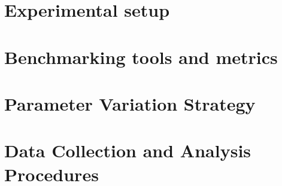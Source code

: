 \section{Experimental setup}

\section{Benchmarking tools and metrics}

\section{Parameter Variation Strategy}

\section{Data Collection and Analysis Procedures}